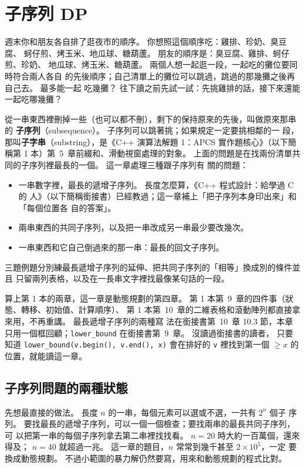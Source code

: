 \chapter{子序列 DP}
\label{ch:subseq}

週末你和朋友各自排了逛夜市的順序。 你想照這個順序吃：雞排、珍奶、臭豆腐、
蚵仔煎、烤玉米、地瓜球、糖葫蘆。 朋友的順序是：臭豆腐、雞排、蚵仔煎、珍奶、
地瓜球、烤玉米、糖葫蘆。 兩個人想一起逛一段，一起吃的攤位要同時符合兩人各自
的先後順序；自己清單上的攤位可以跳過，跳過的那幾攤之後再自己去。 最多能一起
吃幾攤？ 往下讀之前先試一試：先挑雞排的話，接下來還能一起吃哪幾攤？

從一串東西裡刪掉一些（也可以都不刪），剩下的保持原來的先後，叫做原來那串的
\textbf{子序列}（subsequence）。 子序列可以跳著挑；如果規定一定要挑相鄰的一
段，那叫\textbf{子字串}（substring），是《C++ 演算法解題 1：APCS 實作題核心》（以下簡稱第 1 本）第~5~章前綴和、滑動視窗處理的對象。
上面的問題是在找兩份清單共同的子序列裡最長的一個。 這一章處理三種跟子序列有
關的問題：

\begin{itemize}
\item 一串數字裡，最長的遞增子序列。 長度怎麼算，《C++ 程式設計：給學過 C 的
人》（以下簡稱銜接書）已經教過；這一章補上「把子序列本身印出來」和「每個位置各
自的答案」。
\item 兩串東西的共同子序列，以及把一串改成另一串最少要改幾次。
\item 一串東西和它自己倒過來的那一串：最長的回文子序列。
\end{itemize}

三題例題分別練最長遞增子序列的延伸、把共同子序列的「相等」換成別的條件並且
只留兩列表格，以及在一長串文字裡找最像某句話的一段。

算上第 1 本的兩章，這一章是動態規劃的第四章。 第 1 本第~9~章的四件事（狀態、轉移、初始值、計算順序）、
第 1 本第~10~章的二維表格和滾動陣列都直接拿來用，不再重講。 最長遞增子序列的兩種寫
法在銜接書第~10~章 10.3 節，本章只用一個框回顧；\texttt{lower\_bound} 在銜接書第~9~章。 沒讀過銜接書的讀者，
只要知道 \texttt{lower\_bound(v.begin(), v.end(), x)} 會在排好的
\texttt{v} 裡找到第一個 $\ge x$ 的位置，就能讀這一章。

\section{子序列問題的兩種狀態}
\label{sec:ss-states}

先想最直接的做法。 長度 $n$ 的一串，每個元素可以選或不選，一共有 $2^n$ 個子
序列。 要找最長的遞增子序列，可以一個一個檢查；要找兩串的最長共同子序列，可
以把第一串的每個子序列拿去第二串裡找找看。 $n = 20$ 時大約一百萬個，還來得及；
$n = 40$ 就超過一兆。 這一章的題目，$n$ 常常到幾千甚至 $2 \times 10^5$，一定
要換成動態規劃。 不過小範圍的暴力解仍然要寫，用來和動態規劃的程式比對。

